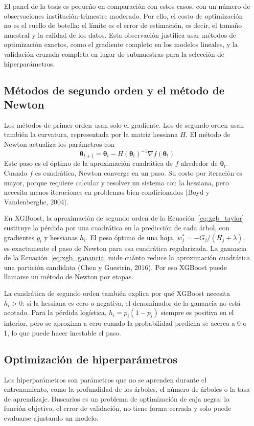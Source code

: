 El panel de la tesis es pequeño en comparación con estos casos, con un número de observaciones institución-trimestre moderado. Por ello, el costo de optimización no es el cuello de botella: el límite es el error de estimación, es decir, el tamaño muestral y la calidad de los datos. Esta observación justifica usar métodos de optimización exactos, como el gradiente completo en los modelos lineales, y la validación cruzada completa en lugar de submuestras para la selección de hiperparámetros.

\subsection{Métodos de segundo orden y el método de Newton}
Los métodos de primer orden usan solo el gradiente. Los de segundo orden usan también la curvatura, representada por la matriz hessiana $H$. El método de Newton actualiza los parámetros con
\begin{equation}
\boldsymbol{\theta}_{t+1}=\boldsymbol{\theta}_t-H(\boldsymbol{\theta}_t)^{-1}\nabla f(\boldsymbol{\theta}_t)
\label{eq:newton}
\end{equation}
Este paso es el óptimo de la aproximación cuadrática de $f$ alrededor de $\boldsymbol{\theta}_t$. Cuando $f$ es cuadrática, Newton converge en un paso. Su costo por iteración es mayor, porque requiere calcular y resolver un sistema con la hessiana, pero necesita menos iteraciones en problemas bien condicionados (Boyd y Vandenberghe, 2004).

En XGBoost, la aproximación de segundo orden de la Ecuación~\eqref{eq:xgb_taylor} sustituye la pérdida por una cuadrática en la predicción de cada árbol, con gradientes $g_i$ y hessianas $h_i$. El peso óptimo de una hoja, $w_j^{\ast}=-G_j/(H_j+\lambda)$, es exactamente el paso de Newton para esa cuadrática regularizada. La ganancia de la Ecuación~\eqref{eq:xgb_ganancia} mide cuánto reduce la aproximación cuadrática una partición candidata (Chen y Guestrin, 2016). Por eso XGBoost puede llamarse un método de Newton por etapas.

La cuadrática de segundo orden también explica por qué XGBoost necesita $h_i>0$: si la hessiana es cero o negativa, el denominador de la ganancia no está acotado. Para la pérdida logística, $h_i=p_i(1-p_i)$ siempre es positiva en el interior, pero se aproxima a cero cuando la probabilidad predicha se acerca a 0 o 1, lo que puede hacer inestable el paso.

\subsection{Optimización de hiperparámetros}
Los hiperparámetros son parámetros que no se aprenden durante el entrenamiento, como la profundidad de los árboles, el número de árboles o la tasa de aprendizaje. Buscarlos es un problema de optimización de caja negra: la función objetivo, el error de validación, no tiene forma cerrada y solo puede evaluarse ajustando un modelo.

